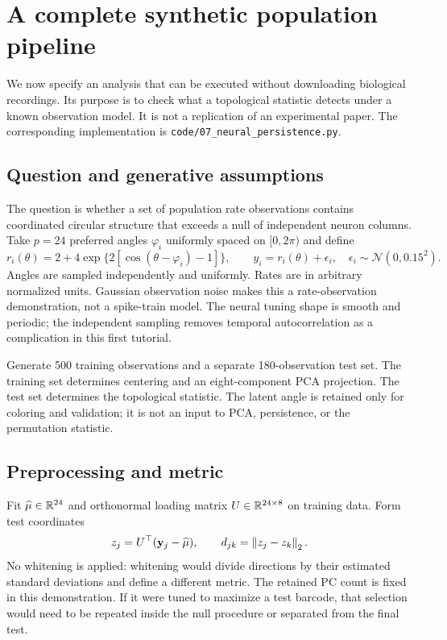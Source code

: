 \section{A complete synthetic population pipeline}
\label{sec:09-pipeline}
We now specify an analysis that can be executed without downloading biological recordings. Its purpose is to check what a topological statistic detects under a known observation model. It is not a replication of an experimental paper. The corresponding implementation is \texttt{code/07\_neural\_persistence.py}.

\subsection{Question and generative assumptions}
The question is whether a set of population rate observations contains coordinated circular structure that exceeds a null of independent neuron columns. Take $p=24$ preferred angles $\varphi_i$ uniformly spaced on $[0,2\pi)$ and define
\begin{equation}
 r_i(\theta)=2+4\exp\{2[\cos(\theta-\varphi_i)-1]\},\qquad
 y_i=r_i(\theta)+\epsilon_i,\quad
 \epsilon_i\sim\mathcal N(0,0.15^2).\label{eq:09-synthetic}
\end{equation}
Angles are sampled independently and uniformly. Rates are in arbitrary normalized units. Gaussian observation noise makes this a rate-observation demonstration, not a spike-train model. The neural tuning shape is smooth and periodic; the independent sampling removes temporal autocorrelation as a complication in this first tutorial.

Generate 500 training observations and a separate 180-observation test set. The training set determines centering and an eight-component PCA projection. The test set determines the topological statistic. The latent angle is retained only for coloring and validation; it is not an input to PCA, persistence, or the permutation statistic.

\subsection{Preprocessing and metric}
Fit $\widehat\mu\in\mathbb{R}^{24}$ and orthonormal loading matrix $U\in\mathbb{R}^{24\times8}$ on training data. Form test coordinates
\begin{equation}
 z_j=U^\top(\mathbf y_j-\widehat\mu),\qquad
 d_{jk}=\left\lVert z_j-z_k\right\rVert_2.\label{eq:09-projection}
\end{equation}
No whitening is applied: whitening would divide directions by their estimated standard deviations and define a different metric. The retained PC count is fixed in this demonstration. If it were tuned to maximize a test barcode, that selection would need to be repeated inside the null procedure or separated from the final test.

